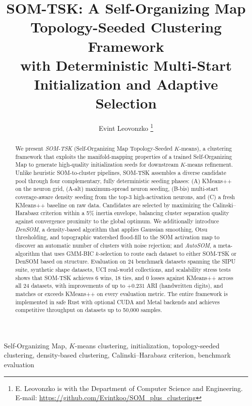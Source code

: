 \documentclass[journal]{IEEEtran}
\begin{document}
\title{SOM-TSK: A Self-Organizing Map Topology-Seeded Clustering Framework\\
with Deterministic Multi-Start Initialization and Adaptive Selection}

\author{Evint Leovonzko%
\thanks{E. Leovonzko is with the Department of Computer Science and Engineering. E-mail: \protect\url{https://github.com/Evintkoo/SOM\_plus\_clustering}}}

\maketitle

\begin{abstract}
We present \textit{SOM-TSK} (Self-Organizing Map Topology-Seeded $K$-means), a clustering framework that exploits the manifold-mapping properties of a trained Self-Organizing Map to generate high-quality initialization seeds for downstream $K$-means refinement. Unlike heuristic SOM-to-cluster pipelines, SOM-TSK assembles a diverse candidate pool through four complementary, fully deterministic seeding phases: (A) KMeans++ on the neuron grid, (A-alt) maximum-spread neuron seeding, (B-bis) multi-start coverage-aware density seeding from the top-3 high-activation neurons, and (C) a fresh KMeans++ baseline on raw data. Candidates are selected by maximizing the Calinski--Harabasz criterion within a 5\% inertia envelope, balancing cluster separation quality against convergence proximity to the global optimum. We additionally introduce \textit{DenSOM}, a density-based algorithm that applies Gaussian smoothing, Otsu thresholding, and topographic watershed flood-fill to the SOM activation map to discover an automatic number of clusters with noise rejection; and \textit{AutoSOM}, a meta-algorithm that uses GMM-BIC $k$-selection to route each dataset to either SOM-TSK or DenSOM based on structure. Evaluation on 24 benchmark datasets spanning the SIPU suite, synthetic shape datasets, UCI real-world collections, and scalability stress tests shows that SOM-TSK achieves 6 wins, 18 ties, and 0 losses against KMeans++ across all 24 datasets, with improvements of up to $+0.231$ ARI (handwritten digits), and matches or exceeds KMeans++ on every evaluation metric. The entire framework is implemented in safe Rust with optional CUDA and Metal backends and achieves competitive throughput on datasets up to 50,000 samples.
\end{abstract}

\begin{IEEEkeywords}
Self-Organizing Map, $K$-means clustering, initialization, topology-seeded clustering, density-based clustering, Calinski--Harabasz criterion, benchmark evaluation
\end{IEEEkeywords}
\end{document}
